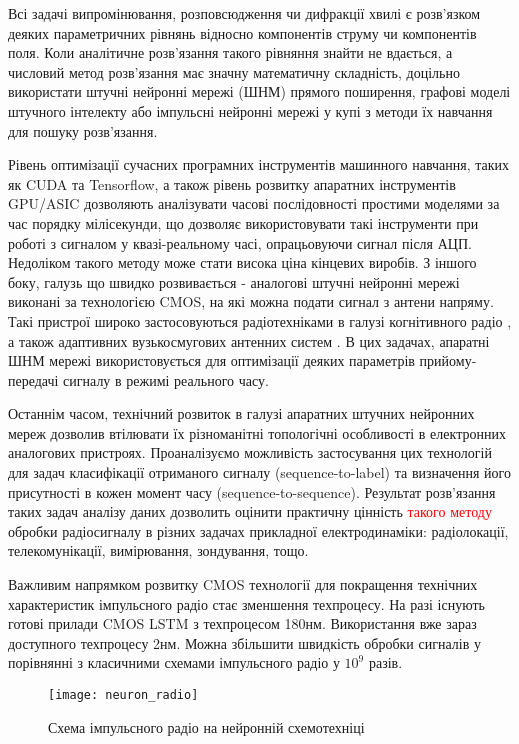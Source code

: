 Всі задачі випромінювання, розповсюдження чи дифракції хвилі є розв'язком
деяких параметричних рівнянь відносно компонентів струму чи компонентів 
поля. Коли аналітичне розв'язання такого рівняння знайти не вдається, а 
числовий метод розв'язання має значну математичну складність, доцільно 
використати штучні нейронні мережі (ШНМ) прямого поширення, графові моделі 
штучного інтелекту або імпульсні нейронні мережі у купі з методи їх навчання 
для пошуку розв'язання.

Рівень оптимізації сучасних програмних інструментів машинного навчання, таких 
як CUDA та Tensorflow, а також рівень розвитку апаратних інструментів GPU/ASIC
дозволяють аналізувати часові послідовності простими моделями за час порядку 
мілісекунди, що дозволяє використовувати такі інструменти при роботі з 
сигналом у квазі-реальному часі, опрацьовуючи сигнал після АЦП. Недоліком 
такого методу може стати висока ціна кінцевих виробів. З іншого боку, галузь 
що швидко розвивається - аналогові штучні нейронні мережі виконані за 
технологією CMOS, на які можна подати сигнал з антени напряму. Такі пристрої 
широко застосовуються радіотехніками в галузі когнітивного радіо 
\cite{imp:Husseini2010}, а також адаптивних вузькосмугових антенних систем 
\cite{imp:Zbynek2002}. В цих задачах, апаратні ШНМ мережі використовується 
для оптимізації деяких параметрів прийому-передачі сигналу в режимі реального 
часу.

Останнім часом, технічний розвиток в галузі апаратних штучних нейронних мереж 
дозволив втілювати їх різноманітні топологічні особливості в електронних 
аналогових пристроях. Проаналізуємо можливість застосування цих технологій для 
задач класифікації отриманого сигналу (sequence-to-label) та визначення його 
присутності в кожен момент часу (sequence-to-sequence). Результат розв'язання 
таких задач аналізу даних дозволить оцінити практичну цінність 
\textcolor{red}{такого методу} обробки радіосигналу в різних задачах 
прикладної електродинаміки: радіолокації, телекомунікації, вимірювання, 
зондування, тощо. 

Важливим напрямком розвитку CMOS технології для покращення технічних 
характеристик імпульсного радіо стає зменшення техпроцесу. На разі існують
готові прилади CMOS LSTM з техпроцесом 180нм. Використання вже зараз 
доступного техпроцесу 2нм. Можна збільшити швидкість обробки сигналів у 
порівнянні з класичними схемами імпульсного радіо у $ 10^9 $ разів. 

\begin{figure}[htbp] \begin{center}
\texttt{[image: neuron\_radio]}
\caption{Схема імпульсного радіо на нейронній схемотехніці} 
\label{fig:neural_radio}
\end{center} \end{figure}


